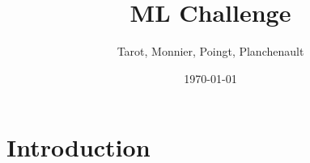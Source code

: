 \documentclass{article}
\begin{document}
\title{ML Challenge}
\author{Tarot, Monnier, Poingt, Planchenault}
\date{\today}

\maketitle

\section{Introduction}



\end{document}
